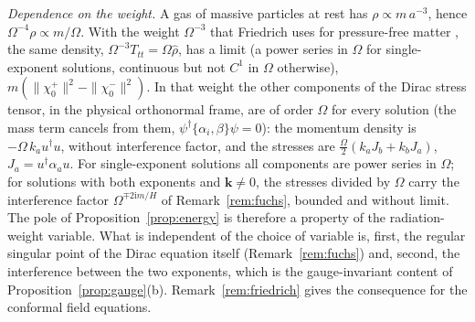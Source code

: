 \documentclass[11pt,a4paper]{article}
\theoremstyle{definition}
\newcommand{\ii}{\mathrm{i}}
\begin{document}
\emph{Dependence on the weight.} A gas of massive particles at rest has $\rho\propto m\,a^{-3}$, hence $\Omega^{-4}\rho\propto m/\Omega$. With the weight $\Omega^{-3}$ that Friedrich uses for pressure-free matter \cite{Friedrich2017}, the same density, $\Omega^{-3}T_{tt}=\Omega\hat\rho$, has a limit (a power series in $\Omega$ for single-exponent solutions, continuous but not $C^{1}$ in $\Omega$ otherwise), $m(\|\chi_{0}^{+}\|^{2}-\|\chi_{0}^{-}\|^{2})$. In that weight the other components of the Dirac stress tensor, in the physical orthonormal frame, are of order $\Omega$ for every solution (the mass term cancels from them, $\psi^{\dagger}\{\alpha_{i},\beta\}\psi=0$): the momentum density is $-\Omega\,k_{a}u^{\dagger}u$, without interference factor, and the stresses are $\tfrac{\Omega}{2}(k_{a}J_{b}+k_{b}J_{a})$, $J_{a}=u^{\dagger}\alpha_{a}u$. For single-exponent solutions all components are power series in $\Omega$; for solutions with both exponents and $\mathbf{k}\neq0$, the stresses divided by $\Omega$ carry the interference factor $\Omega^{\mp2\ii m/H}$ of Remark~\ref{rem:fuchs}, bounded and without limit. The pole of Proposition~\ref{prop:energy} is therefore a property of the radiation-weight variable. What is independent of the choice of variable is, first, the regular singular point of the Dirac equation itself (Remark~\ref{rem:fuchs}) and, second, the interference between the two exponents, which is the gauge-invariant content of Proposition~\ref{prop:gauge}(b). Remark~\ref{rem:friedrich} gives the consequence for the conformal field equations.
\end{document}
